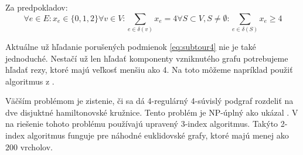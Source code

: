 Za predpokladov:
\begin{subequations}
\begin{equation}\forall e \in E: x_e \in \{0, 1, 2\}\end{equation}
\begin{equation}\forall v \in V: \sum_{e \in \delta(v)} x_e = 4\end{equation}
\begin{equation}\forall S \subset V, S \neq \emptyset: \sum_{e \in \delta(S)} x_e \geq 4
\label{eq:subtour4}
\end{equation}
\end{subequations}

Aktuálne už hľadanie porušených podmienok \eqref{eq:subtour4} nie je také jednoduché.
Nestačí už len hľadať komponenty vzniknutého grafu potrebujeme hľadať rezy, ktoré
majú veľkosť menšiu ako 4. Na toto môžeme napríklad použiť algoritmus z \cite{stoer}. 

Väčším problémom je zistenie, či sa dá 4-regulárný 4-súvislý podgraf rozdeliť na dve
disjuktné hamiltonovské kružnice. Tento problém je NP-úplný ako ukázal \cite{hamdecomp}.
V \cite{duchenne} na riešenie tohoto problému používajú upravený 3-index algoritmus.
Takýto 2-index algoritmus funguje pre náhodné euklidovské grafy, ktoré majú menej ako $200$
vrcholov.
